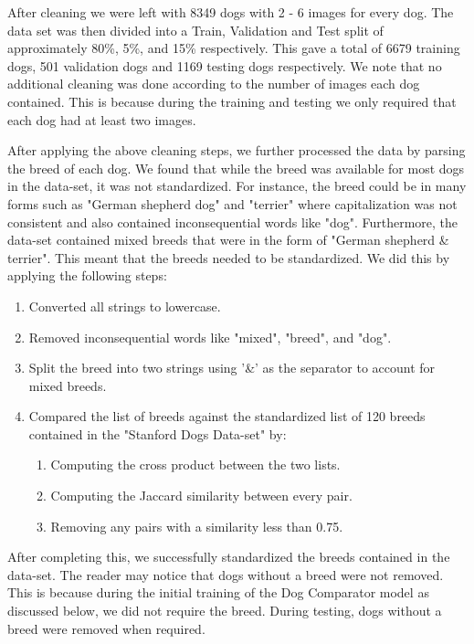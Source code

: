 \documentclass{article}
\begin{document}
\noindent After cleaning we were left with 8349 dogs with 2 - 6 images for every dog.  The data set was then divided into a Train, Validation and Test split of approximately 80\%, 5\%, and 15\% respectively.  This gave a total of 6679 training dogs, 501 validation dogs and 1169 testing dogs respectively.  We note that no additional cleaning was done according to the number of images each dog contained.  This is because during the training and testing we only required that each dog had at least two images.

After applying the above cleaning steps, we further processed the data by parsing the breed of each dog.  We found that while the breed was available for most dogs in the data-set, it was not standardized.  For instance, the breed could be in many forms such as "German shepherd dog" and "terrier" where capitalization was not consistent and also contained inconsequential words like "dog".  Furthermore, the data-set contained mixed breeds that were in the form of "German shepherd \& terrier".  This meant that the breeds needed to be standardized.  We did this by applying the following steps:

\begin{enumerate}
  \item Converted all strings to lowercase.
  
  \item Removed inconsequential words like "mixed", "breed", and "dog".
  
  \item Split the breed into two strings using '\&' as the separator to account for mixed breeds.
    
  \item Compared the list of breeds against the standardized list of 120 breeds contained in the "Stanford Dogs Data-set" \cite{stanforddogs} by:
    \begin{enumerate}
      \item Computing the cross product between the two lists.
      \item Computing the Jaccard similarity between every pair.
      \item Removing any pairs with a similarity less than 0.75.
    \end{enumerate}
\end{enumerate} 

\noindent After completing this, we successfully standardized the breeds contained in the data-set.  The reader may notice that dogs without a breed were not removed.  This is because during the initial training of the Dog Comparator model as discussed below, we did not require the breed.  During testing, dogs without a breed were removed when required.
\end{document}

